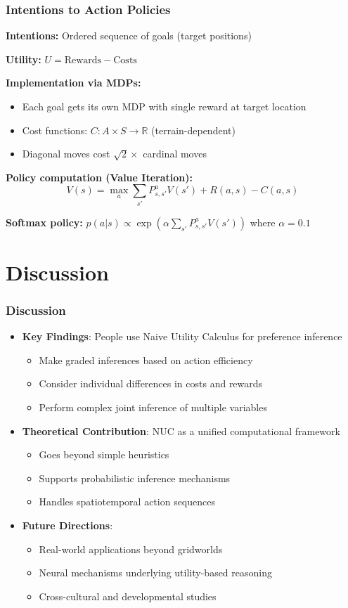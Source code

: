 \documentclass{beamer}
\begin{document}
\begin{frame}
\frametitle{Intentions to Action Policies}
\textbf{Intentions:} Ordered sequence of goals (target positions)

\vspace{0.2cm}
\textbf{Utility:} $U = \text{Rewards} - \text{Costs}$

\vspace{0.2cm}
\textbf{Implementation via MDPs:}
\begin{itemize}
    \item Each goal gets its own MDP with single reward at target location
    \item Cost functions: $C: A \times S \rightarrow \mathbb{R}$ (terrain-dependent)
    \item Diagonal moves cost $\sqrt{2} \times$ cardinal moves
\end{itemize}

\vspace{0.2cm}
\textbf{Policy computation (Value Iteration):}
$$V(s) = \max_a \sum_{s'} P^a_{s,s'} V(s') + R(a,s) - C(a,s)$$

\vspace{0.2cm}
\textbf{Softmax policy:} $p(a|s) \propto \exp(\alpha \sum_{s'} P^a_{s,s'} V(s'))$ where $\alpha = 0.1$
\end{frame}


\section{Discussion}
\begin{frame}
\frametitle{Discussion}
\begin{itemize}
    \item \textbf{Key Findings}: People use Naive Utility Calculus for preference inference
    \begin{itemize}
        \item Make graded inferences based on action efficiency
        \item Consider individual differences in costs and rewards
        \item Perform complex joint inference of multiple variables
    \end{itemize}
    \item \textbf{Theoretical Contribution}: NUC as a unified computational framework
    \begin{itemize}
        \item Goes beyond simple heuristics
        \item Supports probabilistic inference mechanisms
        \item Handles spatiotemporal action sequences
    \end{itemize}
    \item \textbf{Future Directions}: 
    \begin{itemize}
        \item Real-world applications beyond gridworlds
        \item Neural mechanisms underlying utility-based reasoning
        \item Cross-cultural and developmental studies
    \end{itemize}
\end{itemize}
\end{frame}
\end{document}
